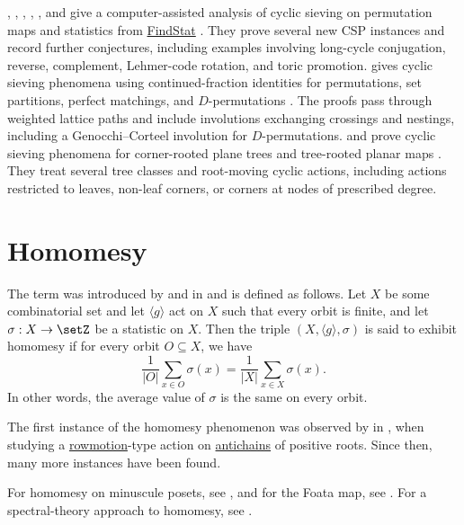 , , ,
, , and 
give a computer-assisted analysis of cyclic sieving on permutation maps and
statistics from \href{https://www.findstat.org}{FindStat}
\cite{AdamsElderLafreniereMcNicholasStrikerWelch2025}.  They prove several
new CSP instances and record further conjectures, including examples
involving long-cycle conjugation, reverse, complement, Lehmer-code rotation,
and toric promotion.
 gives cyclic sieving phenomena using continued-fraction
identities for permutations, set partitions, perfect matchings, and
$D$-permutations \cite{Deb2025ContinuedFractionsCSP}.  The proofs pass
through weighted lattice paths and include involutions exchanging crossings
and nestings, including a Genocchi--Corteel involution for $D$-permutations.
 and  prove
cyclic sieving phenomena for corner-rooted plane trees and tree-rooted planar
maps \cite{BousquetMelouKrattenthaler2025x}.  They treat several tree classes
and root-moving cyclic actions, including actions restricted to leaves,
non-leaf corners, or corners at nodes of prescribed degree.



\section[homomesy]{Homomesy}


The term  was introduced by  and
 in \cite{ProppRoby2013x} and is defined as follows.
Let $X$ be some combinatorial set and let $\langle g \rangle$ act on $X$ such that every orbit is finite,
and let $\sigma : X \to \setZ$ be a statistic on $X$.
Then the triple $(X,\langle g \rangle,\sigma)$ is said to exhibit homomesy if for every orbit $O \subseteq X$, we have
\[
\frac{1}{|O|} \sum_{x \in O} \sigma(x) = \frac{1}{|X|} \sum_{x \in X} \sigma(x).
\]
In other words, the average value of $\sigma$ is the same on every orbit.

The first instance of the homomesy phenomenon was observed 
by  in \cite{Panyushev2009},
when studying a \hyperref[rowmotion]{rowmotion}-type action on
\hyperref[antichain]{antichains} of positive roots.
Since then, many more instances have been found.


For homomesy on minuscule posets, see \cite{Okada2021},
and for the Foata map, see \cite{LaCroixRoby2020x}.
For a spectral-theory approach to homomesy, see \cite{Propp2021x}.


